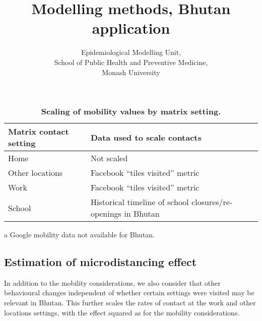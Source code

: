 \documentclass{article}
\author{
    Epidemiological Modelling Unit,
    \\ School of Public Health and Preventive Medicine,
    \\ Monash University
}
\title{Modelling methods, Bhutan application}
\begin{document}
\maketitle
\tableofcontents
\newpage










\begin{table}
    \begin{threeparttable}
    \begin{tabularx}{\textwidth}{| X | X |}
        \hline
        \textbf{Matrix contact setting} & \textbf{Data used to scale contacts} \\
        \hline
        Home & Not scaled \\
        \hline
        Other locations & Facebook ``tiles visited'' metric \tnote{a} \\
        \hline
        Work & Facebook ``tiles visited'' metric \tnote{a} \\
        \hline
        School & Historical timeline of school closures/re-openings in Bhutan \\
        \hline
	\end{tabularx}
	\caption{\textbf{Scaling of mobility values by matrix setting.}}
	\label{tab:location_scaling}
    \begin{tablenotes}
        \item[a] Google mobility data not available for Bhutan.
    \end{tablenotes}
    \end{threeparttable}
\end{table}

\subsection{Estimation of microdistancing effect}
In addition to the mobility considerations, we also consider that other
behavioural changes independent of whether certain settings were visited
may be relevant in Bhutan.
This further scales the rates of contact at the work and other locations settings,
with the effect squared as for the mobility considerations.
\end{document}
